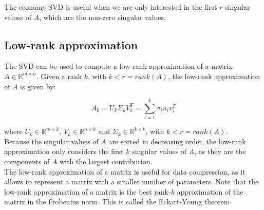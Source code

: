 The economy SVD is useful when we are only interested in the first $r$ singular values of $A$, which are the non-zero singular values.\\

\subsection{Low-rank approximation}

The SVD can be used to compute a low-rank approximation of a matrix $A \in \mathbb{R}^{m \times n}$. Given a rank $k$, with $k < r = rank(A)$,
the low-rank approximation of $A$ is given by:

\begin{equation}
    A_k = U_k \Sigma_k V_k^T = \sum_{i=1}^{k} \sigma_i u_i v_i^T
\end{equation}

where $U_k \in \mathbb{R}^{m \times k}$, $V_k \in \mathbb{R}^{n \times k}$ and $\Sigma_k \in \mathbb{R}^{k \times k}$, with $k < r = rank(A)$.\\

Because the singular values of $A$ are sorted in decreasing order, the low-rank approximation only considers the first $k$ singular values of $A$,
as they are the components of $A$ with the largest contribution.\\

The low-rank approximation of a matrix is useful for data compression, as it allows to represent a matrix with a smaller number of parameters. 
Note that the low-rank approximation of a matrix is the best rank-$k$ approximation of the matrix in the Frobenius norm. This is called 
the Eckart-Young theorem.









